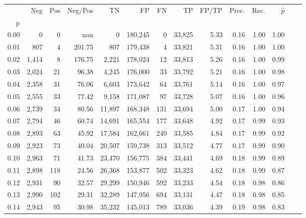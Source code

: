 \begin{tabular}{rrrrrrrrrrrrrr}
\toprule
{} &    Neg &  Pos & Neg/Pos &       TN &       FP &      FN &      TP & FP/TP & Prec. &  Rec. & $\hat{p}$ \\
p    &        &      &         &          &          &         &         &       &       &       &           \\
\midrule
0.00 &      0 &    0 &     nan &        0 &  180,245 &       0 &  33,825 &  5.33 &  0.16 &  1.00 &      1.00 \\
0.01 &    807 &    4 &  201.75 &      807 &  179,438 &       4 &  33,821 &  5.31 &  0.16 &  1.00 &      1.00 \\
0.02 &  1,414 &    8 &  176.75 &    2,221 &  178,024 &      12 &  33,813 &  5.26 &  0.16 &  1.00 &      0.99 \\
0.03 &  2,024 &   21 &   96.38 &    4,245 &  176,000 &      33 &  33,792 &  5.21 &  0.16 &  1.00 &      0.98 \\
0.04 &  2,358 &   31 &   76.06 &    6,603 &  173,642 &      64 &  33,761 &  5.14 &  0.16 &  1.00 &      0.97 \\
0.05 &  2,555 &   33 &   77.42 &    9,158 &  171,087 &      97 &  33,728 &  5.07 &  0.16 &  1.00 &      0.96 \\
0.06 &  2,739 &   34 &   80.56 &   11,897 &  168,348 &     131 &  33,694 &  5.00 &  0.17 &  1.00 &      0.94 \\
0.07 &  2,794 &   46 &   60.74 &   14,691 &  165,554 &     177 &  33,648 &  4.92 &  0.17 &  0.99 &      0.93 \\
0.08 &  2,893 &   63 &   45.92 &   17,584 &  162,661 &     240 &  33,585 &  4.84 &  0.17 &  0.99 &      0.92 \\
0.09 &  2,923 &   73 &   40.04 &   20,507 &  159,738 &     313 &  33,512 &  4.77 &  0.17 &  0.99 &      0.90 \\
0.10 &  2,963 &   71 &   41.73 &   23,470 &  156,775 &     384 &  33,441 &  4.69 &  0.18 &  0.99 &      0.89 \\
0.11 &  2,898 &  118 &   24.56 &   26,368 &  153,877 &     502 &  33,323 &  4.62 &  0.18 &  0.99 &      0.87 \\
0.12 &  2,931 &   90 &   32.57 &   29,299 &  150,946 &     592 &  33,233 &  4.54 &  0.18 &  0.98 &      0.86 \\
0.13 &  2,990 &  102 &   29.31 &   32,289 &  147,956 &     694 &  33,131 &  4.47 &  0.18 &  0.98 &      0.85 \\
0.14 &  2,943 &   95 &   30.98 &   35,232 &  145,013 &     789 &  33,036 &  4.39 &  0.19 &  0.98 &      0.83 \\

\end{tabular}
